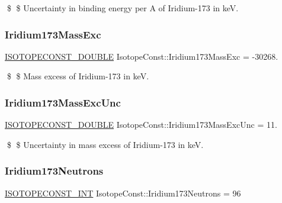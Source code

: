 \$ \$ Uncertainty in binding energy per A of Iridium-\/173 in keV. \mbox{\label{group___isotope_const-_iridium-_ir173_ga78ba3394bfba60347da0589b70e08614}} 
\subsubsection{\texorpdfstring{Iridium173\+Mass\+Exc}{Iridium173MassExc}}
{\footnotesize\ttfamily \mbox{\hyperlink{group___isotope_const-_macros_ga8f45a7272ce02c0b4c65c44636ed719a}{I\+S\+O\+T\+O\+P\+E\+C\+O\+N\+S\+T\+\_\+\+D\+O\+U\+B\+LE}} Isotope\+Const\+::\+Iridium173\+Mass\+Exc = -\/30268.}

\$ \$ Mass excess of Iridium-\/173 in keV. \mbox{\label{group___isotope_const-_iridium-_ir173_ga81dfdcbd789a16d006ad17b91b3f8b05}} 
\subsubsection{\texorpdfstring{Iridium173\+Mass\+Exc\+Unc}{Iridium173MassExcUnc}}
{\footnotesize\ttfamily \mbox{\hyperlink{group___isotope_const-_macros_ga8f45a7272ce02c0b4c65c44636ed719a}{I\+S\+O\+T\+O\+P\+E\+C\+O\+N\+S\+T\+\_\+\+D\+O\+U\+B\+LE}} Isotope\+Const\+::\+Iridium173\+Mass\+Exc\+Unc = 11.}

\$ \$ Uncertainty in mass excess of Iridium-\/173 in keV. \mbox{\label{group___isotope_const-_iridium-_ir173_gabfa7392a4ee51fa4297cb185a6b11319}} 
\subsubsection{\texorpdfstring{Iridium173\+Neutrons}{Iridium173Neutrons}}
{\footnotesize\ttfamily \mbox{\hyperlink{group___isotope_const-_macros_ga5f18360b3e99483a35c32d789e62621c}{I\+S\+O\+T\+O\+P\+E\+C\+O\+N\+S\+T\+\_\+\+I\+NT}} Isotope\+Const\+::\+Iridium173\+Neutrons = 96}

